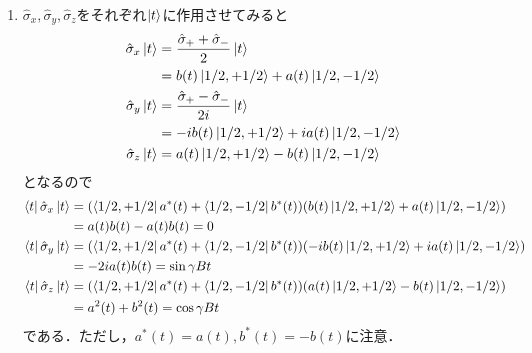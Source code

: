 \documentclass[a4paper,pdflatex,ja=standard]{bxjsarticle}
\begin{document}
\begin{enumerate}
  \item 
  $\hat{\sigma}_{x},\hat{\sigma}_{y},\hat{\sigma}_{z}$をそれぞれ$\ket{t}$に作用させてみると
  \begin{align}
    \hat{\sigma}_{x}\ket{t}
    &=
    \frac{\hat{\sigma}_{+}+\hat{\sigma}_{-}}{2}\ket{t}
    \nonumber
    \\
    &=
    b(t)\ket{1/2,+1/2}
    +
    a(t)\ket{1/2,-1/2}
    \\
    \hat{\sigma}_{y}\ket{t}
    &=
    \frac{\hat{\sigma}_{+}-\hat{\sigma}_{-}}{2i}\ket{t}
    \nonumber
    \\
    &=
    -ib(t)\ket{1/2,+1/2}
    +ia(t)\ket{1/2,-1/2}    
    \\
    \hat{\sigma}_{z}\ket{t}
    &=
    a(t)\ket{1/2,+1/2}
    -
    b(t)\ket{1/2,-1/2}   
  \end{align}
  となるので
  \begin{align}
    \bra{t}\hat{\sigma}_{x}\ket{t}
    &=
    (\bra{1/2,+1/2}a^{*}(t)+\bra{1/2,-1/2}b^{*}(t))
    (b(t)\ket{1/2,+1/2}
    +
    a(t)\ket{1/2,-1/2})
    \nonumber
    \\
    &=
    a(t)b(t)
    -
    a(t)b(t)
    =
    0
    \\
    \bra{t}\hat{\sigma}_{y}\ket{t}
    &=
    (\bra{1/2,+1/2}a^{*}(t)+\bra{1/2,-1/2}b^{*}(t))
    (-ib(t)\ket{1/2,+1/2}
    +ia(t)\ket{1/2,-1/2})
    \nonumber
    \\
    &=
    -2ia(t)b(t)
    =
    \sin \gamma Bt
    \\
    \bra{t}\hat{\sigma}_{z}\ket{t}
    &=
    (\bra{1/2,+1/2}a^{*}(t)+\bra{1/2,-1/2}b^{*}(t))
    (a(t)\ket{1/2,+1/2}
    -
    b(t)\ket{1/2,-1/2})
    \nonumber
    \\
    &=
    a^{2}(t)
    +
    b^{2}(t)
    =
    \cos \gamma Bt
  \end{align}
  である．ただし，$a^{*}(t)=a(t),b^{*}(t)=-b(t)$に注意．


\end{enumerate}
\end{document}
